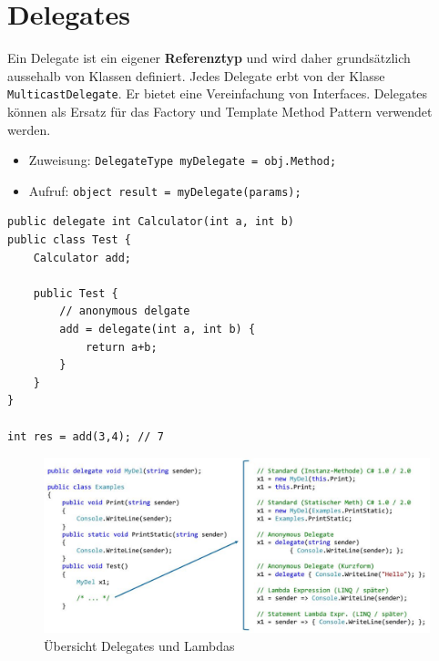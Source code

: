 \documentclass[
a4paper,
oneside,
10pt,
fleqn,
headsepline,
toc=listofnumbered, 
bibliography=totocnumbered]{scrartcl}
\let\stdsection\section
\renewcommand\section{\clearpage\stdsection}
\begin{document}
\section{Delegates}
Ein Delegate ist ein eigener \textbf{Referenztyp} und wird daher grundsätzlich aussehalb von Klassen definiert. Jedes Delegate erbt von der Klasse \lstinline|MulticastDelegate|. Er bietet eine Vereinfachung von Interfaces. Delegates können als Ersatz für das Factory und Template Method Pattern verwendet werden. 
\begin{itemize}
	\item Zuweisung: \lstinline|DelegateType myDelegate = obj.Method;|
	\item Aufruf: \lstinline|object result = myDelegate(params);|
\end{itemize}
\begin{lstlisting}
public delegate int Calculator(int a, int b)
public class Test {
	Calculator add;
	
	public Test {
		// anonymous delgate
		add = delegate(int a, int b) {
			return a+b;
		}
	}
}

int res = add(3,4); // 7
\end{lstlisting}

\begin{figure}[h]
	\centering
	\includegraphics[width=\linewidth]{images/delegate_lamda_overview}
	\caption{Übersicht Delegates und Lambdas}
	\label{fig:delegateLambdaoverview}
\end{figure}

\clearpage
\end{document}
